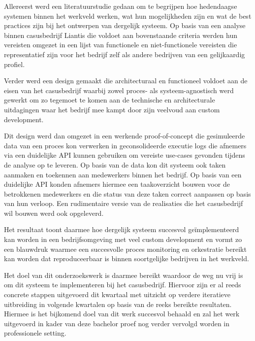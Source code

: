Allereerst werd een literatuurstudie gedaan om te begrijpen hoe hedendaagse systemen binnen het werkveld werken, wat hun mogelijkheden zijn en wat de best practices zijn bij het ontwerpen van dergelijk systeem. Op basis van een analyse binnen casusbedrijf Liantis die voldoet aan bovenstaande criteria werden hun vereisten omgezet in een lijst van functionele en niet-functionele vereisten die representatief zijn voor het bedrijf zelf als andere bedrijven van een gelijkaardig profiel.\newline

Verder werd een design gemaakt die architecturaal en functioneel voldoet aan de eisen van het casusbedrijf waarbij zowel proces- als systeem-agnostisch werd gewerkt om zo tegemoet te komen aan de technische en architecturale uitdagingen waar het bedrijf mee kampt door zijn veelvoud aan custom development.\newline

Dit design werd dan omgezet in een werkende proof-of-concept die gesimuleerde data van een proces kon verwerken in geconsolideerde executie logs die afnemers via een duidelijke API kunnen gebruiken om vereiste use-cases gevonden tijdens de analyse op te leveren.  Op basis van de data kon dit systeem ook taken aanmaken en toekennen aan medewerkers binnen het bedrijf. Op basis van een duidelijke API konden afnemers hiermee een taakoverzicht bouwen voor de betrokkenen medewerkers en die status van deze taken correct aanpassen op basis van hun verloop. Een rudimentaire versie van de realisaties die het casusbedrijf wil bouwen werd ook opgeleverd.\newline

Het resultaat toont daarmee hoe dergelijk systeem succesvol geïmplementeerd kan worden in een bedrijfsomgeving met veel custom development en vormt zo een blauwdruk waarmee een succesvolle proces monitoring en orkestratie bereikt kan worden dat reproduceerbaar is binnen soortgelijke bedrijven in het werkveld.\newline

Het doel van dit onderzoekswerk is daarmee bereikt waardoor de weg nu vrij is om dit systeem te implementeren bij het casusbedrijf. Hiervoor zijn er al reeds concrete stappen uitgevoerd dit kwartaal met uitzicht op verdere iteratieve uitbreiding in volgende kwartalen op basis van de reeks bereikte resultaten. Hiermee is het bijkomend doel van dit werk succesvol behaald en zal het werk uitgevoerd in kader van deze bachelor proef nog verder vervolgd worden in professionele setting.


